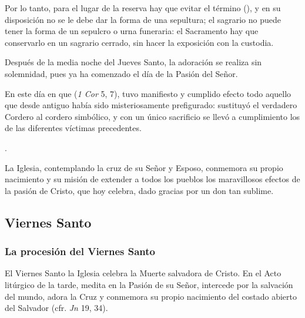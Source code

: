 \begin{introstyle}
Por lo tanto, para el lugar de la reserva hay que evitar el término  (), y en su disposición no se le debe dar la forma de una sepultura; el sagrario no puede tener la forma de un sepulcro o urna funeraria: el Sacramento hay que conservarlo en un sagrario cerrado, sin hacer la exposición con la custodia.

Después de la media noche del Jueves Santo, la adoración se realiza sin solemnidad, pues ya ha comenzado el día de la Pasión del Señor.

En este día en que  (\textit{1 Cor} 5, 7), tuvo manifiesto y cumplido efecto todo aquello que desde antiguo había sido misteriosamente prefigurado: sustituyó el verdadero Cordero al cordero simbólico, y con un único sacrificio se llevó a cumplimiento los de las diferentes víctimas precedentes.

.

La Iglesia, contemplando la cruz de su Señor y Esposo, conmemora su propio nacimiento y su misión de extender a todos los pueblos los maravillosos efectos de la pasión de Cristo, que hoy celebra, dado gracias por un don tan sublime.

\subsection{Viernes Santo} 

\subsubsection{La procesión del Viernes Santo}

El Viernes Santo la Iglesia celebra la Muerte salvadora de Cristo. En el Acto litúrgico de la tarde, medita en la Pasión de su Señor, intercede por la salvación del mundo, adora la Cruz y conmemora su propio nacimiento del costado abierto del Salvador (cfr. \textit{Jn} 19, 34).


\end{introstyle}
